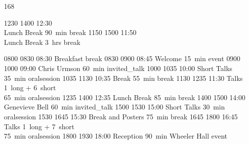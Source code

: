 \setslotsize{3cm}{1.3mm}
 {168}
\settextframe{1.5mm}
\setbottomspace{0pt}
\begin{timetable}

   {1230} {1400} {12:30\\\vspace{0.2em}Lunch Break}         {90~min}                {}                   {break}
   {1150} {1500} {11:50\\\vspace{0.2em}Lunch Break}         {3~hrs}                {}                   {break}

   {0800} {0830} {08:30 Breakfast}                      {}                            {}        {break}
   {0830} {0900} {08:45 Welcome}                      {\vspace{1.5mm}15~min}          {}        {event}
   {0900} {1000} {09:00 Chris Urmson}                 {60~min}                        {}                      {invited_talk}
   {1000} {1035} {10:00 Short Talks}                  {\vspace{1.5mm}35~min}          {}        {oralsession}
   {1035} {1130} {10:35 Break}                        {\vspace{1.5mm}55~min}          {}      {break}
   {1130} {1235} {11:30 Talks}                        {\vspace{-0.5em}1~long + 6~short\\65~min}{}             {oralsession}
   {1235} {1400} {12:35 Lunch Break}                  {85~min}                        {}                            {break}
   {1400} {1500} {14:00 Genevieve Bell}               {60~min}                        {}                      {invited_talk}
   {1500} {1530} {15:00 Short Talks} 		      {\vspace{1.5mm}30~min}          {}        {oralsession}
   {1530} {1645} {15:30 Break and Posters}            {\vspace{1.5mm}75~min}          {}      {break}
   {1645} {1800} {16:45 Talks}                        {\vspace{-0.5em}1~long + 7~short\\75~min}{}             {oralsession}
   {1800} {1930} {18:00 Reception}  	              {\vspace{1.5mm}90~min}          {\vspace{-0.7em}Wheeler Hall}        {event}



\end{timetable}
